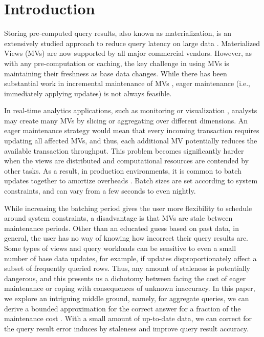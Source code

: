 \vspace{-0.5em}
\section{Introduction}
Storing pre-computed query results, also known as materialization, is an extensively studied approach to reduce query latency on large data \cite{LarsonY85, gupta1995maintenance, chirkova2011materialized}. 
Materialized Views (MVs) are now supported by all major commercial vendors.
However, as with any pre-computation or caching, the key challenge in using MVs is maintaining their freshness as base data changes.
While there has been substantial work in incremental maintenance of MVs \cite{chirkova2011materialized, DBLP:journals/vldb/KochAKNNLS14}, eager maintenance (i.e., immediately applying updates) is not always feasible.

In real-time analytics applications, such as monitoring or visualization \cite{rainbird, DBLP:journals/cgf/LiuJH13}, analysts may create many MVs by slicing or aggregating over different dimensions.
An eager maintenance strategy would mean that every incoming transaction requires updating all affected MVs, and thus, each additional MV potentially reduces the available transaction throughput.
This problem becomes significantly harder when the views are distributed and computational resources are contended by other tasks.
As a result, in production environments, it is common to batch updates together to amortize overheads \cite{chirkova2011materialized}.
Batch sizes are set according to system constraints, and can vary from a few seconds to even nightly.  

While increasing the batching period gives the user more flexibility to schedule around system constraints, a disadvantage is that MVs are stale between maintenance periods.
Other than an educated guess based on past data, in general, the user has no way of knowing how incorrect their query results are.
Some types of views and query workloads can be sensitive to even a small number of base data updates, for example, if updates disproportionately affect a subset of frequently queried rows.
Thus, any amount of staleness is potentially dangerous, and this presents us a dichotomy between facing the cost of eager maintenance or coping with consequences of unknown inaccuracy.
In this paper, we explore an intriguing middle ground, namely, for aggregate queries, we can derive a bounded approximation for the correct answer for a fraction of the maintenance cost . 
With a small amount of up-to-date data, we can correct for the query result error induces  by staleness and improve query result accuracy.


